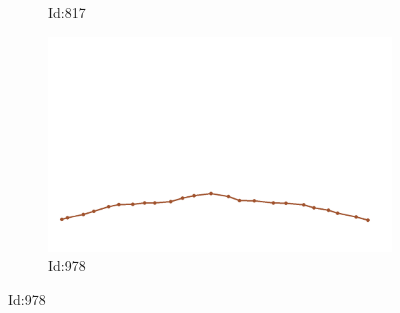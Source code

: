 \documentclass[12pt,twoside]{report}
\begin{document}
\begin{figure}
\begin{subfigure}[b]{0.20\textwidth}
\caption{Id:817}
\end{subfigure}
\begin{subfigure}[b]{0.20\textwidth}
\centering
\includegraphics[width=\textwidth]{../../trajectories/978.png}
\caption{Id:978}
\end{subfigure}
\end{figure}
\end{document}
